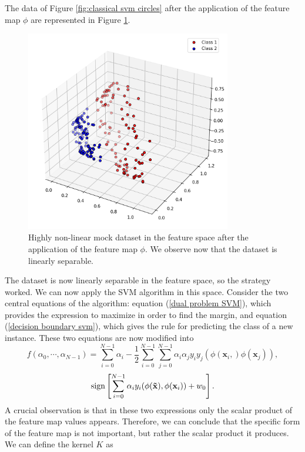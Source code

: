 \documentclass[12pt]{article}
\begin{document}
The data of Figure \ref{fig:classical svm circles} after the application of the feature map $\phi$ are represented in Figure \ref{fig:classical svm circle 3d}. 
\begin{figure}[h!]
    \centering
    \includegraphics[width=0.8\textwidth]{images/circles3d.png}
    \caption{Highly non-linear mock dataset in the feature space after the application of the feature map $\phi$. We observe now that the dataset is linearly separable.}
    \label{fig:classical svm circle 3d}
\end{figure}
The dataset is now linearly separable in the feature space, so the strategy worked. We can now apply the SVM algorithm in this space. Consider the two central equations of the algorithm: equation (\ref{dual problem SVM}), which provides the expression to maximize in order to find the margin, and equation (\ref{decision boundary svm}), which gives the rule for predicting the class of a new instance. These two equations are now modified into 
\begin{equation}
    f(\alpha_0,\cdots,\alpha_{N-1})=\sum_{i=0}^{N-1} \alpha_i-\frac{1}{2}\sum_{i=0}^{N-1}\sum_{j=0}^{N-1}\alpha_i\alpha_jy_iy_j(\phi(\mathbf{x}_i,)\phi(\mathbf{x}_j)),
    \label{kernel max}
\end{equation}
\begin{equation}
    \textup{sign}\left[\sum_{i=0}^{N-1}\alpha_iy_i(\phi(\mathbf{\tilde{x}}), \phi(\mathbf{x}_i))+w_0\right].
    \label{kernel prodiction}
\end{equation}
A crucial observation is that in these two expressions only the scalar product of the feature map values appears. Therefore, we can conclude that the specific form of the feature map is not important, but rather the scalar product it produces. We can define the kernel $K$ as 
\end{document}
